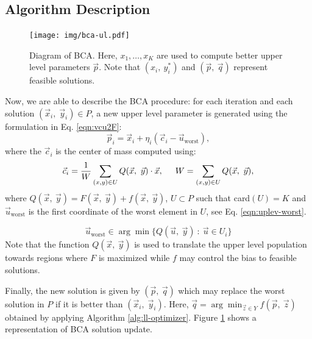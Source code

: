 \documentclass[conference]{IEEEtran}
\begin{document}
\subsection{Algorithm Description} %
\label{sub:algorithm_description}

\begin{figure}[!ht]
    \centering
    \texttt{[image: img/bca-ul.pdf]}
    \caption{Diagram of BCA. Here, $x_1,\ldots,x_K$ are used to compute better
    upper level parameters $\vec{p}$. Note that $(x_i,\ y_i^*)$ and
    $(\vec{p},\ \vec{q})$ represent feasible solutions.}
    \label{fig:bca-diag}
\end{figure}

Now, we are able to describe the BCA procedure: for each iteration and each
solution $(\vec{x}_i,\; \vec{y}_i) \in P$, a new upper level parameter is generated
using the formulation in Eq. \ref{eqn:vcu2F}:
% 
\begin{equation}
    \vec{p}_i =  \vec{x}_i + \eta _{i} ( \vec{c}_i - \vec{u}_{ \text{worst} } ),
    \label{eqn:vcu2F}
\end{equation}
% 
%
where the $\vec{c}_i$ is the center of mass computed using:
%
\begin{equation}
    \vec{c}_i = \dfrac{1} {W} \sum_{(x,y) \in U} Q(\vec{x},\ \vec{y}) \cdot \vec{x} , 
            \hspace{0.5cm} 
            W = \sum_{ (x,y) \in U} Q(\vec{x},\ \vec{y}),
    \label{eqn:centerF}
\end{equation} 
% 
where $Q(\vec{x},\ \vec{y}) = F(\vec{x},\ \vec{y}) + f(\vec{x},\ \vec{y})$, $U \subset P $
such that card$(U) = K$  and $\vec{u}_{ \text{worst}}$ is the first coordinate of
the worst element in $U$, see Eq. \ref{eqn:uplev-worst}.

\begin{equation}
    \vec{u}_{\text{worst}} \in \arg \min \{Q(\vec{u}, \ \vec{y} ) 
    \ : \
    \vec{u} \in U_i \}
    \label{eqn:uplev-worst}
\end{equation}
% 
Note that the function $Q(\vec{x},\ \vec{y})$ is used to translate the upper level
population towards regions where $F$ is maximized while $f$ may control the bias to
feasible solutions.

Finally, the new solution is given by $ (\vec{p}, \ \vec{q}) $ which may 
replace the worst solution in $ P $ if it is better than $(\vec{x}_i,\; \vec{y}_i)$. Here,
$  \vec{q} = \arg \min _ {\vec{z} \in Y} f (\vec{p}, \ \vec{z}) $ obtained
by applying Algorithm \ref{alg:ll-optimizer}. Figure \ref{fig:bca-diag}
shows a representation of BCA solution update. 
\end{document}
